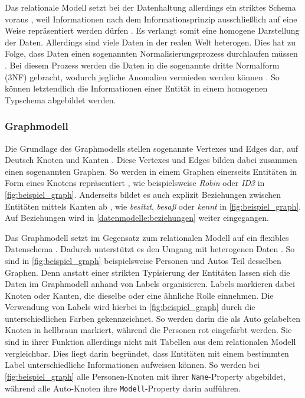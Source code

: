 Das relationale Modell setzt bei der Datenhaltung allerdings ein striktes Schema voraus \cite{rdbms_book}, weil Informationen nach dem Informationsprinzip ausschließlich auf eine Weise repräsentiert werden dürfen \cite{rdbms_history}. Es verlangt somit eine homogene Darstellung der Daten. Allerdings sind viele Daten in der realen Welt heterogen. Dies hat zu Folge, dass Daten einen sogenannten Normalisierungsprozess durchlaufen müssen \cite{rdbms_book}. Bei diesem Prozess werden die Daten in die sogenannte dritte Normalform (3NF) gebracht, wodurch jegliche Anomalien vermieden werden können \cite{rdbms_book}. So können letztendlich die Informationen einer Entität in einem homogenen Typschema abgebildet werden. 

\subsubsection{Graphmodell}
Die Grundlage des Graphmodells stellen sogenannte Vertexes und Edges dar, auf Deutsch Knoten und Kanten \cite{gdbms}. Diese Vertexes und Edges bilden dabei zusammen einen sogenannten Graphen. So werden in einem Graphen einerseits Entitäten in Form eines Knotens repräsentiert \cite{gdbms}, wie beispielsweise \textit{Robin} oder \textit{ID3} in \autoref{fig:beispiel_graph}. Anderseits bildet es auch explizit Beziehungen zwischen Entitäten mittels Kanten ab \cite{gdbms}, wie \textit{besitzt}, \textit{besaß} oder \textit{kennt} in \autoref{fig:beispiel_graph}. Auf Beziehungen wird in \autoref{datenmodelle:beziehungen} weiter eingegangen.

Das Graphmodell setzt im Gegensatz zum relationalen Modell auf ein flexibles Datenschema \cite{gdbms}. Dadurch unterstützt es den Umgang mit heterogenen Daten \cite{gdbms}. So sind in \autoref{fig:beispiel_graph} beispielsweise Personen und Autos Teil desselben Graphen. Denn anstatt einer strikten Typisierung der Entitäten lassen sich die Daten im Graphmodell anhand von Labels organisieren. Labels markieren dabei Knoten oder Kanten, die dieselbe oder eine ähnliche Rolle einnehmen. Die Verwendung von Labels wird hierbei in \autoref{fig:beispiel_graph} durch die unterschiedlichen Farben gekennzeichnet. So werden darin die als Auto gelabelten Knoten in hellbraun markiert, während die Personen rot eingefärbt werden. Sie sind in ihrer Funktion allerdings nicht mit Tabellen aus dem relationalen Modell vergleichbar. Dies liegt darin begründet, dass Entitäten mit einem bestimmten Label unterschiedliche Informationen aufweisen können. So werden bei \autoref{fig:beispiel_graph} alle Personen-Knoten mit ihrer \texttt{Name}-Property abgebildet, während alle Auto-Knoten ihre \texttt{Modell}-Property darin aufführen.

